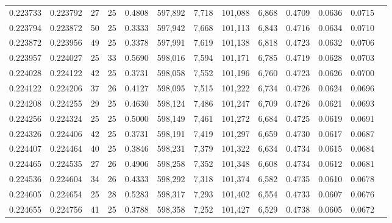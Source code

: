 \begin{tabular}{rrrrrrrrrrrrr}
0.223733 & 0.223792 &  27 &  25 &                                     0.4808 & 597,892 &   7,718 & 101,088 &   6,868 & 0.4709 & 0.0636 & 0.0715 \\
0.223794 & 0.223872 &  50 &  25 &                                     0.3333 & 597,942 &   7,668 & 101,113 &   6,843 & 0.4716 & 0.0634 & 0.0710 \\
0.223872 & 0.223956 &  49 &  25 &                                     0.3378 & 597,991 &   7,619 & 101,138 &   6,818 & 0.4723 & 0.0632 & 0.0706 \\
0.223957 & 0.224027 &  25 &  33 &                                     0.5690 & 598,016 &   7,594 & 101,171 &   6,785 & 0.4719 & 0.0628 & 0.0703 \\
0.224028 & 0.224122 &  42 &  25 &                                     0.3731 & 598,058 &   7,552 & 101,196 &   6,760 & 0.4723 & 0.0626 & 0.0700 \\
0.224122 & 0.224206 &  37 &  26 &                                     0.4127 & 598,095 &   7,515 & 101,222 &   6,734 & 0.4726 & 0.0624 & 0.0696 \\
0.224208 & 0.224255 &  29 &  25 &                                     0.4630 & 598,124 &   7,486 & 101,247 &   6,709 & 0.4726 & 0.0621 & 0.0693 \\
0.224256 & 0.224324 &  25 &  25 &                                     0.5000 & 598,149 &   7,461 & 101,272 &   6,684 & 0.4725 & 0.0619 & 0.0691 \\
0.224326 & 0.224406 &  42 &  25 &                                     0.3731 & 598,191 &   7,419 & 101,297 &   6,659 & 0.4730 & 0.0617 & 0.0687 \\
0.224407 & 0.224464 &  40 &  25 &                                     0.3846 & 598,231 &   7,379 & 101,322 &   6,634 & 0.4734 & 0.0615 & 0.0684 \\
0.224465 & 0.224535 &  27 &  26 &                                     0.4906 & 598,258 &   7,352 & 101,348 &   6,608 & 0.4734 & 0.0612 & 0.0681 \\
0.224536 & 0.224604 &  34 &  26 &                                     0.4333 & 598,292 &   7,318 & 101,374 &   6,582 & 0.4735 & 0.0610 & 0.0678 \\
0.224605 & 0.224654 &  25 &  28 &                                     0.5283 & 598,317 &   7,293 & 101,402 &   6,554 & 0.4733 & 0.0607 & 0.0676 \\
0.224655 & 0.224756 &  41 &  25 &                                     0.3788 & 598,358 &   7,252 & 101,427 &   6,529 & 0.4738 & 0.0605 & 0.0672 \\

\end{tabular}
